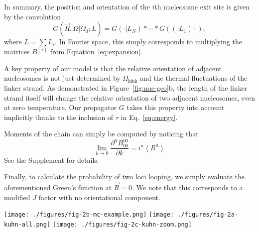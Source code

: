 \documentclass[%
 reprint,
superscriptaddress,
showpacs,preprintnumbers,
 amsmath,amssymb,
 aps,
 prl,
]{revtex4-1}
\newcommand{\greens}[2][\Omega_0; L]{G(#2|#1)}
\begin{document}
In summary, the position and orientation of the $i$th nucleosome exit site
    is given by the convolution
\begin{equation}\label{eq:conv}
    \greens{\vec{R}, \Omega} = \greens[L_N]{\cdot} * \cdots{} *
    \greens[L_1](\cdot),
\end{equation}
where $L = \sum L_i$.
In Fourier space, this simply corresponds to multiplying the matrices $B^{(i)}$
    from Equation~\ref{eq:expansion}.

A key property of our model is that the relative orientation of adjacent
    nucleosomes is not just determined by $\Omega_\text{kink}$ and the thermal
    fluctuations of the linker strand.
As demonstrated in Figure~\ref{fig:nuc-geo}b, the length of the linker strand
    itself will change the relative orientation of two adjacent nucleosomes,
    even at zero temperature.
Our propagator $G$ takes this property into account implicitly thanks to the
    inclusion of $\tau$ in Eq.~\ref{eq:energy}.

Moments of the chain can simply be computed by noticing that
\begin{equation}\label{eq:moments}
    \lim_{k\to0} \frac{\partial^n B_{00}^{00}}{\partial k} = i^n \left\langle
    R^n\right\rangle
\end{equation}
See the Supplement for details.

Finally, to calculate the probability of two loci looping, we simply evaluate
    the aforementioned Green's function at $\vec{R} = 0$.
We note that this corresponds to a modified $J$ factor with no orientational
    component.

\begin{figure*}[th]
    \centering
    \texttt{[image: ./figures/fig-2b-mc-example.png]}
    \texttt{[image: ./figures/fig-2a-kuhn-all.png]}
    \texttt{[image: ./figures/fig-2c-kuhn-zoom.png]}
    \caption{(a) The Kuhn lengths of homogenous chains are
    \SI{10.5}{\basepair} periodic
    in linker length, with each linker length representing a distinct,
    discretized helical
    WLC\@. In the limit of long linkers, the kuhn length eventually approaches that of bare DNA,
    \SI{100}{\nano\metre}. (b) Zero-temperature structure vs. Monte Carlo simulation
    snapshot of nucleosome chain with \SI{38}{\basepair} linkers. (c) Compact, superhelical structures afford more
    flexibility than non-compact fibres, which have higher Kuhn lengths. Thus,
    the overall structure of chromatin is extremely sensitive to changes in the
    nucleosome repeat length.}\label{fig:homo-kuhn}
\end{figure*}
\end{document}
